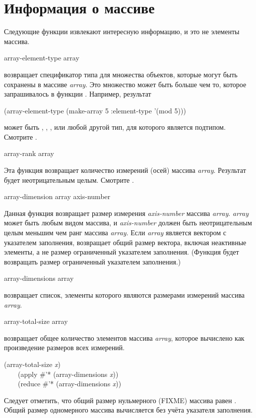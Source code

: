 \section{Информация о массиве}

Следующие функции извлекают интересную информацию, и это не элементы
массива.

\begin{defun}[Функция]
array-element-type array

 возвращает спецификатор типа для множества объектов,
которые могут быть сохранены в массиве \emph{array}. Это множество может быть
больше чем то, которое запрашивалось в функции . Например,
результат
\begin{lisp}
(array-element-type (make-array 5 :element-type '(mod 5)))
\end{lisp}
может быть , , ,  или любой другой
тип, для которого  является подтипом. Смотрите .
\end{defun}

\begin{defun}[Функция]
array-rank array

Эта функция возвращает количество измерений (осей) массива \emph{array}.
Результат будет неотрицательным целым.
Смотрите .
\end{defun}

\begin{defun}[Функция]
array-dimension array axis-number

Данная функция возвращает размер измерения \emph{axis-number} массива
\emph{array}.
\emph{array} может быть любым видом массива, и \emph{axis-number} должен быть
неотрицательным целым меньшим чем ранг массива \emph{array}.
Если \emph{array} является вектором с указателем заполнения,
 возвращает общий размер вектора, включая неактивные
элементы, а не размер ограниченный указателем заполнения.
(Функция  будет возвращать размер ограниченный указателем
заполнения.) 
\end{defun}

\begin{defun}[Функция]
array-dimensions array

 возвращает список, элементы которого являются размерами
измерений массива \emph{array}.
\end{defun}

\begin{defun}[Функция]
array-total-size array

 возвращает общее количество элементов массива
\emph{array}, которое вычислено как произведение размеров всех измерений.
\begin{lisp}
(array-total-size \emph{x}) \\
~~~\EQ\ (apply \#'* (array-dimensions \emph{x})) \\
~~~\EQ\ (reduce \#'* (array-dimensions \emph{x}))
\end{lisp}
Следует отметить, что общий размер нульмерного (FIXME) массива равен .
Общий размер одномерного массива вычисляется без учёта указателя заполнения.
\end{defun}

